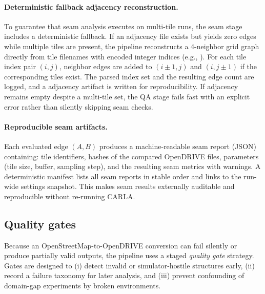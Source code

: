\paragraph{Deterministic fallback adjacency reconstruction.}
To guarantee that seam analysis executes on multi-tile runs, the seam stage includes a deterministic fallback. If an adjacency file exists but yields zero edges while multiple tiles are present, the pipeline reconstructs a 4-neighbor grid graph directly from tile filenames with encoded integer indices (e.g., ). For each tile index pair $(i,j)$, neighbor edges are added to $(i\pm1,j)$ and $(i,j\pm1)$ if the corresponding tiles exist. The parsed index set and the resulting edge count are logged, and a  adjacency artifact is written for reproducibility. If adjacency remains empty despite a multi-tile set, the QA stage fails fast with an explicit error rather than silently skipping seam checks.

\paragraph{Reproducible seam artifacts.}
Each evaluated edge $(A,B)$ produces a machine-readable seam report (JSON) containing: tile identifiers, hashes of the compared OpenDRIVE files, parameters (tile size, buffer, sampling step), and the resulting seam metrics with warnings. A deterministic manifest lists all seam reports in stable order and links to the run-wide settings snapshot. This makes seam results externally auditable and reproducible without re-running CARLA.


\subsection{Quality gates}
\label{sec:quality_gates}
Because an OpenStreetMap-to-OpenDRIVE conversion can fail silently or produce partially valid outputs, the pipeline uses a staged \emph{quality gate} strategy.
Gates are designed to (i) detect invalid or simulator-hostile structures early, (ii) record a failure taxonomy for later analysis, and (iii) prevent confounding of domain-gap experiments by broken environments.

